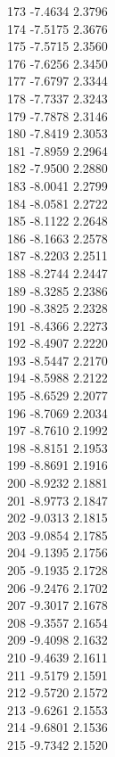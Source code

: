 \documentclass[11pt]{article}
\theoremstyle{definition}
\theoremstyle{plain}
\begin{document}
{173 -7.4634 2.3796\\
174 -7.5175 2.3676\\
175 -7.5715 2.3560\\
176 -7.6256 2.3450\\
177 -7.6797 2.3344\\
178 -7.7337 2.3243\\
179 -7.7878 2.3146\\
180 -7.8419 2.3053\\
181 -7.8959 2.2964\\
182 -7.9500 2.2880\\
183 -8.0041 2.2799\\
184 -8.0581 2.2722\\
185 -8.1122 2.2648\\
186 -8.1663 2.2578\\
187 -8.2203 2.2511\\
188 -8.2744 2.2447\\
189 -8.3285 2.2386\\
190 -8.3825 2.2328\\
191 -8.4366 2.2273\\
192 -8.4907 2.2220\\
193 -8.5447 2.2170\\
194 -8.5988 2.2122\\
195 -8.6529 2.2077\\
196 -8.7069 2.2034\\
197 -8.7610 2.1992\\
198 -8.8151 2.1953\\
199 -8.8691 2.1916\\
200 -8.9232 2.1881\\
201 -8.9773 2.1847\\
202 -9.0313 2.1815\\
203 -9.0854 2.1785\\
204 -9.1395 2.1756\\
205 -9.1935 2.1728\\
206 -9.2476 2.1702\\
207 -9.3017 2.1678\\
208 -9.3557 2.1654\\
209 -9.4098 2.1632\\
210 -9.4639 2.1611\\
211 -9.5179 2.1591\\
212 -9.5720 2.1572\\
213 -9.6261 2.1553\\
214 -9.6801 2.1536\\
215 -9.7342 2.1520\\
}
\end{document}
